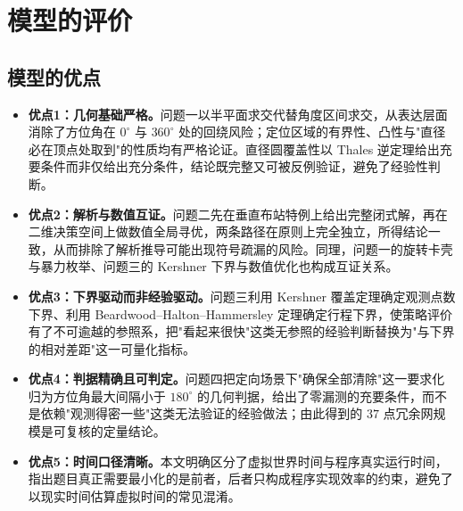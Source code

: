 
\section{模型的评价}

\subsection{模型的优点}
\begin{itemize}[itemindent=2em]
\item \textbf{优点1：几何基础严格。}问题一以半平面求交代替角度区间求交，从表达层面消除了方位角在 $0^\circ$ 与 $360^\circ$ 处的回绕风险；定位区域的有界性、凸性与"直径必在顶点处取到"的性质均有严格论证。直径圆覆盖性以 Thales 逆定理给出充要条件而非仅给出充分条件，结论既完整又可被反例验证，避免了经验性判断。
\item \textbf{优点2：解析与数值互证。}问题二先在垂直布站特例上给出完整闭式解，再在二维决策空间上做数值全局寻优，两条路径在原则上完全独立，所得结论一致，从而排除了解析推导可能出现符号疏漏的风险。同理，问题一的旋转卡壳与暴力枚举、问题三的 Kershner 下界与数值优化也构成互证关系。
\item \textbf{优点3：下界驱动而非经验驱动。}问题三利用 Kershner 覆盖定理确定观测点数下界、利用 Beardwood--Halton--Hammersley 定理确定行程下界，使策略评价有了不可逾越的参照系，把"看起来很快"这类无参照的经验判断替换为"与下界的相对差距"这一可量化指标。
\item \textbf{优点4：判据精确且可判定。}问题四把定向场景下"确保全部清除"这一要求化归为方位角最大间隔小于 $180^\circ$ 的几何判据，给出了零漏测的充要条件，而不是依赖"观测得密一些"这类无法验证的经验做法；由此得到的 $37$ 点冗余网规模是可复核的定量结论。
\item \textbf{优点5：时间口径清晰。}本文明确区分了虚拟世界时间与程序真实运行时间，指出题目真正需要最小化的是前者，后者只构成程序实现效率的约束，避免了以现实时间估算虚拟时间的常见混淆。
\end{itemize}

